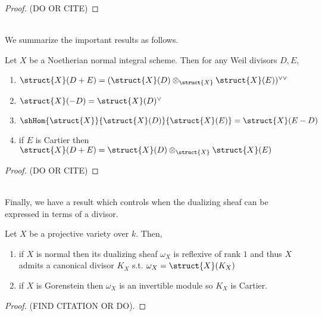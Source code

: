 \documentclass[12pt]{article}
\begin{document}
\begin{proof}
(DO OR CITE)
\end{proof}
\noindent\\
We summarize the important results as follows.
\begin{theorem}
Let $X$ be a Noetherian normal integral scheme. Then for any Weil divisors $D, E$,
\begin{enumerate}
\item $\struct{X}(D + E) = (\struct{X}(D) \otimes_{\struct{X}} \struct{X}(E))^{\vee \vee}$
\item $\struct{X}(-D) = \struct{X}(D)^\vee$
\item $\shHom{\struct{X}}{\struct{X}(D)}{\struct{X}(E)} = \struct{X}(E - D)$
\item if $E$ is Cartier then $\struct{X}(D + E) = \struct{X}(D) \otimes_{\struct{X}} \struct{X}(E)$
\end{enumerate}
\begin{center}

\begin{proof}
(DO OR CITE)
\end{proof}

\end{center}
\end{theorem}
\noindent\\
Finally, we have a result which controls when the dualizing sheaf can be expressed in terms of a divisor.
\begin{prop}
Let $X$ be a projective variety over $k$. Then,
\begin{enumerate}
\item if $X$ is normal then its dualizing sheaf $\omega_X$ is reflexive of rank $1$ and thus $X$ admits a canonical divisor $K_X$ s.t. $\omega_X = \struct{X}(K_X)$
\item if $X$ is Gorenstein then $\omega_X$ is an invertible module so $K_X$ is Cartier.
\end{enumerate}
\end{prop}

\begin{proof}
(FIND CITATION OR DO).
\end{proof}
\end{document}
